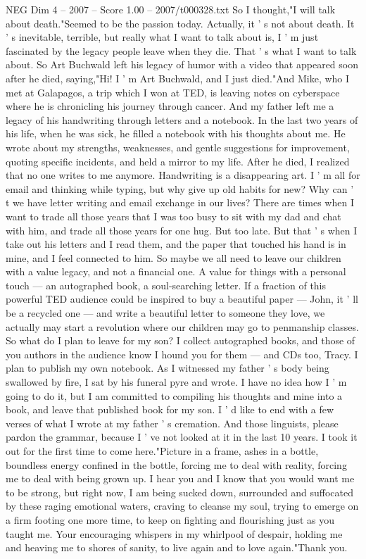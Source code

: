 \begin{textsample}{NEG Dim 4 – 2007 – Score 1.00 – 2007/t000328.txt}  \label{ex:f4_neg_064}
So I thought,"I will talk about death."Seemed to be the passion today.
Actually, it ' s not about death.
It ' s inevitable, terrible, but really what I want to talk about is, I ' m just fascinated by the legacy people leave when they die.
That ' s what I want to talk about.
So Art Buchwald left his legacy of humor with a video that appeared soon after he died, saying,"Hi!
I ' m Art Buchwald, and I just died."And Mike, who I met at Galapagos, a trip which I won at TED, is leaving notes on cyberspace where he is chronicling his journey through cancer.
And my father left me a legacy of his handwriting through letters and a notebook.
In the last two years of his life, when he was sick, he filled a notebook with his thoughts about me.
He wrote about my strengths, weaknesses, and gentle suggestions for improvement, quoting specific incidents, and held a mirror to my life.
After he died, I realized that no one writes to me anymore.
Handwriting is a disappearing art.
I ' m all for email and thinking while typing, but why give up old habits for new?
Why can ' t we have letter writing and email exchange in our lives?
There are times when I want to trade all those years that I was too busy to sit with my dad and chat with him, and trade all those years for one hug.
But too late.
But that ' s when I take out his letters and I read them, and the paper that touched his hand is in mine, and I feel connected to him.
So maybe we all need to leave our children with a value legacy, and not a financial one.
A value for things with a personal touch — an autographed book, a soul-searching letter.
If a fraction of this powerful TED audience could be inspired to buy a beautiful paper — John, it ' ll be a recycled one — and write a beautiful letter to someone they love, we actually may start a revolution where our children may go to penmanship classes.
So what do I plan to leave for my son?
I collect autographed books, and those of you authors in the audience know I hound you for them — and CDs too, Tracy.
I plan to publish my own notebook.
As I witnessed my father ' s body being swallowed by fire, I sat by his funeral pyre and wrote.
I have no idea how I ' m going to do it, but I am committed to compiling his thoughts and mine into a book, and leave that published book for my son.
I ' d like to end with a few verses of what I wrote at my father ' s cremation.
And those linguists, please pardon the grammar, because I ' ve not looked at it in the last 10 years.
I took it out for the first time to come here."Picture in a frame, ashes in a bottle, boundless energy confined in the bottle, forcing me to deal with reality, forcing me to deal with being grown up.
I hear you and I know that you would want me to be strong, but right now, I am being sucked down, surrounded and suffocated by these raging emotional waters, craving to cleanse my soul, trying to emerge on a firm footing one more time, to keep on fighting and flourishing just as you taught me.
Your encouraging whispers in my whirlpool of despair, holding me and heaving me to shores of sanity, to live again and to love again."Thank you.

\end{textsample}
